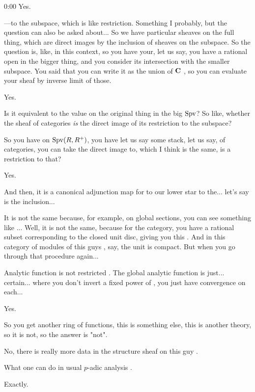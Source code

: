 \begin{unfinished}{0:00}
\ans Yes.

\gabber ---to the subspace, which is like restriction. Something I probably, but the question can also be asked about... So we have particular sheaves on the full thing, which are direct images by the inclusion of sheaves on the subspace. 
So the question is, like, in this context, so you have your, let us say, you have a rational open in the bigger thing, and you consider its intersection with the smaller subspace.
You said that you can write it as the union of $\mathbf C$ , so you can evaluate your sheaf by inverse limit of those. 

\ans Yes.

\gabber Is it equivalent to the value on the original thing in the big $\operatorname{Spv}$? 
So like, whether the sheaf of categories \emph{is} the direct image of its restriction to the subspace?

\gabber So you have on $\operatorname{Spv} (R, R^+)$, you have let us say some stack, let us say, of categories, you can take the direct image to, which I think is the same, is a restriction to that?

\ans Yes.

\gabber And then, it is a canonical adjunction map for to our lower star to the... let's say is the inclusion...

\ans It is not the same because, for example, on global sections, you can see something like ... Well, it is not the same, because for the category, you have a rational subset corresponding to the closed unit disc, giving you this . And in this category of modules of this guys , say, the unit is compact. But when you go through that procedure again...

\gabber Analytic function is not restricted . The global analytic function is just... certain... where you don't invert a fixed power of , you just have convergence on each...

\ans Yes.

\gabber So you get another ring of functions, this is something else, this is another theory, so it is not, so the answer is "not".

\ans No, there is really more data in the structure sheaf on this guy .

\gabber What one can do in usual $p$-adic analysis .

\ans Exactly.

\end{unfinished}